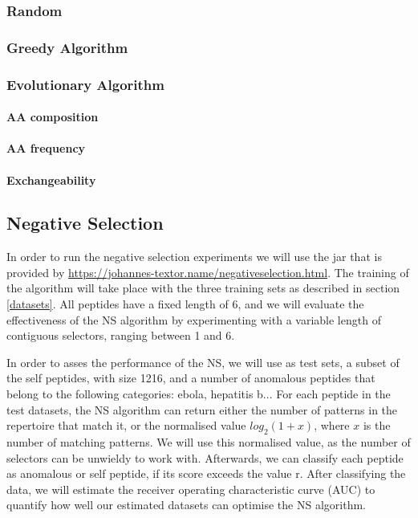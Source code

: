 \documentclass{article}
\begin{document}
\subsubsection{Random}


\subsubsection{Greedy Algorithm}


\subsubsection{Evolutionary Algorithm} 

\paragraph{AA composition}

\paragraph{AA frequency}

\paragraph{Exchangeability}

\subsection{Negative Selection}
In order to run the negative selection experiments we will use the jar that is provided by \url{https://johannes-textor.name/negativeselection.html}.
The training of the algorithm will take place with the three training sets as described in section \ref{datasets}.
All peptides have a fixed length of 6, and we will evaluate the effectiveness of the NS algorithm by experimenting 
with a variable length of contiguous selectors, ranging between 1 and 6. 

In order to asses the performance of the NS, we  will use as test sets, a subset of the self peptides, with size 1216, 
and a number of anomalous peptides that belong to the following categories: ebola, hepatitis b... For each peptide in 
the test datasets, the NS algorithm can return either the number of patterns in the repertoire that match it, or the 
normalised value $log_2(1 + x)$, where $x$ is the number of matching patterns. We will use this normalised value, as the 
number of selectors can be unwieldy to work with. Afterwards, we can classify each peptide as anomalous or self peptide, 
if its score exceeds the value r. After classifying the data, we will estimate the receiver operating characteristic 
curve (AUC) to quantify how well our estimated datasets can optimise the NS algorithm.
\end{document}
